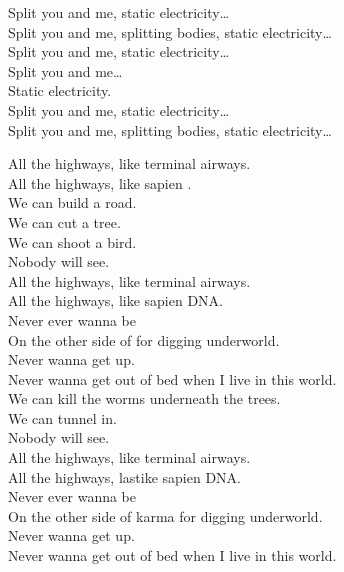 
Split you and me, static electricity… \\
Split you and me, splitting bodies, static electricity… \\
Split you and me, static electricity… \\

Split you and me… \\
Static electricity. \\

Split you and me, static electricity… \\
Split you and me, splitting bodies, static electricity… \\





All the highways, like terminal airways. \\
All the highways, like sapien . \\

We can build a road. \\
We can cut a tree. \\
We can shoot a bird. \\
Nobody will see. \\

All the highways, like terminal airways. \\
All the highways, like sapien DNA. \\

Never ever wanna be \\
On the other side of  for digging underworld. \\
Never wanna get up. \\
Never wanna get out of bed when I live in this world. \\

We can kill the worms underneath the trees. \\
We can tunnel in. \\
Nobody will see. \\

All the highways, like terminal airways. \\
All the highways, lastike sapien DNA. \\

Never ever wanna be \\
On the other side of karma for digging underworld. \\
Never wanna get up. \\
Never wanna get out of bed when I live in this world. \\

